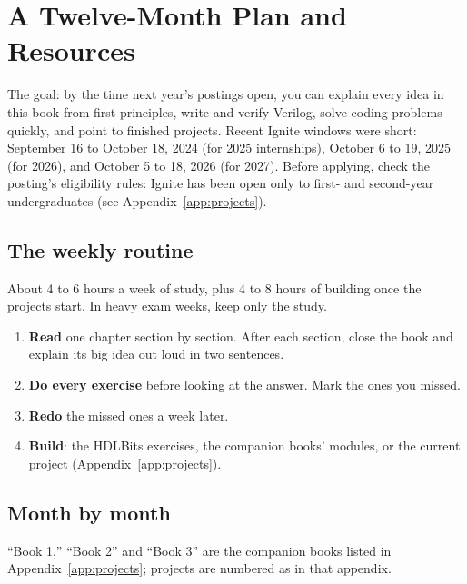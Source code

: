 \chapter{A Twelve-Month Plan and Resources}
\label{app:plan}

The goal: by the time next year's postings open, you can explain every idea in this book from first principles, write and verify Verilog, solve coding problems quickly, and point to finished projects. Recent Ignite windows were short: September 16 to October 18, 2024 (for 2025 internships), October 6 to 19, 2025 (for 2026), and October 5 to 18, 2026 (for 2027). Before applying, check the posting's eligibility rules: Ignite has been open only to first- and second-year undergraduates (see Appendix~\ref{app:projects}).

\section*{The weekly routine}

About 4 to 6 hours a week of study, plus 4 to 8 hours of building once the projects start. In heavy exam weeks, keep only the study.
\begin{enumerate}
  \item \textbf{Read} one chapter section by section. After each section, close the book and explain its big idea out loud in two sentences.
  \item \textbf{Do every exercise} before looking at the answer. Mark the ones you missed.
  \item \textbf{Redo} the missed ones a week later.
  \item \textbf{Build}: the HDLBits exercises, the companion books' modules, or the current project (Appendix~\ref{app:projects}).
\end{enumerate}

\section*{Month by month}

``Book 1,'' ``Book 2'' and ``Book 3'' are the companion books listed in Appendix~\ref{app:projects}; projects are numbered as in that appendix.

